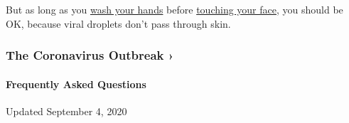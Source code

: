 But as long as you
\href{https://www.nytimes3xbfgragh.onion/2016/04/21/health/washing-hands.html}{wash
your hands} before
\href{https://www.nytimes3xbfgragh.onion/2020/03/02/well/live/coronavirus-spread-transmission-face-touching-hands.html}{touching
your face,} you should be OK, because viral droplets don't pass through
skin.

\href{https://www.nytimes3xbfgragh.onion/news-event/coronavirus?action=click\&pgtype=Article\&state=default\&region=MAIN_CONTENT_3\&context=storylines_faq}{}

\hypertarget{the-coronavirus-outbreak-}{%
\subsubsection{The Coronavirus Outbreak
›}\label{the-coronavirus-outbreak-}}

\hypertarget{frequently-asked-questions}{%
\paragraph{Frequently Asked
Questions}\label{frequently-asked-questions}}

Updated September 4, 2020

